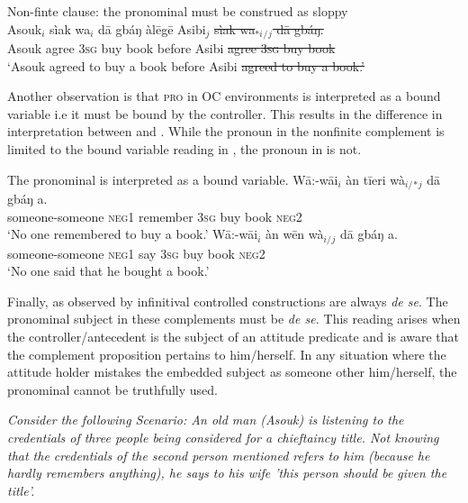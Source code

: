 \documentclass[output=paper,colorlinks,citecolor=brown]{langscibook}
\begin{document}
\ea%
    \label{ex:sulemana:21}
    Non-finte clause: the pronominal must be construed as sloppy\\
    \gll    Asouk$_i$ sìak wa$_i$ dā gbáŋ àlēgē Asibi$_j$ {\sout{sìak wa$_{*i}${}$_/${}$_j$ dā gbáŋ.}} \\
            Asouk agree \textsc{3sg} buy book before Asibi {\sout{agree \textsc{3sg} buy book}}\\
    \glt    `Asouk agreed to buy a book before Asibi {\sout{agreed to buy a book.'}}
\z

Another observation is that \textsc{pro} in OC environments is interpreted as a bound variable i.e it must be bound by the controller. This results in the difference in interpretation between  and . While the pronoun in the nonfinite complement is limited to the bound variable reading in , the pronoun in  is not. 

\ea%
    \label{ex:sulemana:22}
    The pronominal is interpreted as a bound variable.
    \ea%
    \label{ex:sulemana:22a}
    \gll    Wā:-wāi$_i$ àn tīeri  wà$_{i/}${}$_*${}$_j$ dā gbáŋ a. \\
            someone-someone  \textsc{neg1} remember \textsc{3sg} buy book  \textsc{neg2} \\
    \glt    `No one remembered to buy a book.' 
    \ex%
    \label{ex:sulemana:22b}
    \gll    Wā:-wāi$_i$ àn wēn  wà$_{i/}${}$_j$ dā gbáŋ a. \\
            someone-someone \textsc{neg1} say \textsc{3sg} buy book  \textsc{neg2}\\
    \glt    `No one said that he bought a book.' 
    \z
\z

Finally, as observed by \citet{Chierchia1989} infinitival controlled constructions are always {\it{de se}}. The pronominal subject in these complements must be {\it{de se.}} This reading arises when the controller/antecedent is the subject of an attitude predicate and is aware that the complement proposition pertains to him/herself. In any situation where the attitude holder mistakes the embedded subject as someone other him/herself, the pronominal cannot be truthfully used.

{\it{Consider the following Scenario: An old man (Asouk) is listening to the credentials of three people being considered for a chieftaincy title. Not knowing that the credentials of the second person mentioned refers to him (because he hardly remembers anything), he says to his wife 'this person should be given the title'.}}
\end{document}
